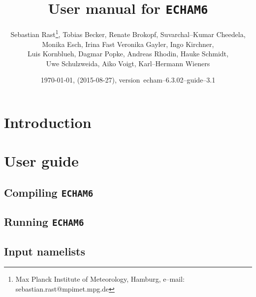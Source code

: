\documentclass[12pt,a4paper]{book}
\newcommand{\echam}{\color{mpggreen}\texttt{ECHAM6}\color{black}}
\newcommand{\echambw}{\texttt{ECHAM6}}
\newcommand{\echamversion}{6.3.02}
\newcommand{\guideversion}{3.1}
\newcommand{\creationdate}{2015-08-27}
\begin{document}
\title{User manual for \echam}
\author{Sebastian Rast\thanks{Max
    Planck Institute of Meteorology, Hamburg, e--mail:
    sebastian.rast@mpimet.mpg.de}, Tobias Becker, Renate Brokopf, Suvarchal--Kumar
  Cheedela, \\
    Monika Esch, Irina Fast
    Veronika Gayler, Ingo Kirchner, \\Luis Kornblueh, Dagmar Popke, Andreas Rhodin,
    Hauke Schmidt, \\ Uwe Schulzweida, Aiko Voigt, Karl--Hermann Wieners}  
\date{\today, (\creationdate), version~echam--\echamversion--guide--\guideversion}

\frontmatter

\maketitle



\tableofcontents

\listoftables
\newpage

\mainmatter
\chapter{Introduction}\label{capintroduction}
   

\chapter{User guide}\label{capuserguide}

  \section[Compiling \echambw]{Compiling \echam}\label{seccompiling}
     

  \section[Running \echambw]{Running \echam}\label{secrunning}
     

  \section{Input namelists}\label{secnamelist}
     
     
     
     
\end{document}
